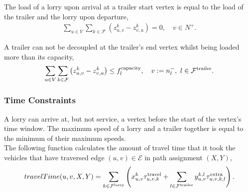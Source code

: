 The load of a lorry upon arrival at a trailer start vertex is equal to the load of the trailer and the lorry upon departure,
\begin{align}
  \sum_{u \in V} \sum_{k \in \mathcal F}
  \left( z^k_{u,v} - z^k_{v,u} \right) = 0, \quad
  v \in N^+.
\end{align}






A trailer can not be decoupled at the trailer's end vertex whilst being loaded more than its capacity,
\begin{align}
  \sum_{u \in V}
  \sum_{k \in \mathcal F}
  \left(
  z^k_{u,v} - z^k_{v,u}
  \right) \leq f_l^{\rm capacity} , \quad
  v :=  n^-_l,
   \ l \in \mathcal F^{\rm trailer}.
\end{align}






\subsubsection{Time Constraints}



%

A lorry can arrive at, but not service, a vertex before the start of the vertex's time window.
The maximum speed of a lorry and a trailer together is equal to the minimum of their maximum speeds.
\\

The following function calculates the amount of travel time
 that it took the vehicles that have traversed edge $(u,v) \in \mathcal E$ in path assignment $(X,Y)$,
%
\begin{align}
  travelTime(u,v,X,Y) =
  \sum_{k \in \mathcal F^{\rm lorry}}
  \left (
  x^k_{u,v}
   \tau_{u,v,k}^{\rm travel}
  +
  \sum_{l \in \mathcal F^{\rm trailer}}
  y^{k,l}_{u,v}
  \tau^{\rm extra }_{u,v,k,l}
  \right).
  \notag
  \end{align}

